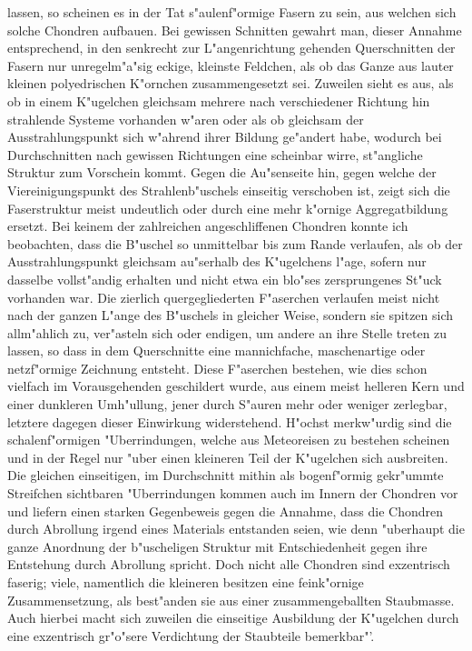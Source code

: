 \documentclass[a4paper, 11pt, oneside]{article}
\begin{document}
lassen, so scheinen es in der Tat s"aulenf"ormige Fasern zu sein, aus welchen sich solche Chondren aufbauen. Bei gewissen Schnitten gewahrt man, dieser Annahme entsprechend, in den senkrecht zur L"angenrichtung gehenden Querschnitten der Fasern nur unregelm"a"sig eckige, kleinste Feldchen, als ob das Ganze aus lauter kleinen polyedrischen K"ornchen zusammengesetzt sei. Zuweilen sieht es aus, als ob in einem K"ugelchen gleichsam mehrere nach verschiedener Richtung hin strahlende Systeme vorhanden w"aren oder als ob gleichsam der Ausstrahlungspunkt sich w"ahrend ihrer Bildung ge"andert habe, wodurch bei Durchschnitten nach gewissen Richtungen eine scheinbar wirre, st"angliche Struktur zum Vorschein kommt. Gegen die Au"senseite hin, gegen welche der Viereinigungspunkt des Strahlenb"uschels einseitig verschoben ist, zeigt sich die Faserstruktur meist undeutlich oder durch eine mehr k"ornige Aggregatbildung ersetzt. Bei keinem der zahlreichen angeschliffenen Chondren konnte ich beobachten, dass die B"uschel so unmittelbar bis zum Rande verlaufen, als ob der Ausstrahlungspunkt gleichsam au"serhalb des K"ugelchens l"age, sofern nur dasselbe vollst"andig erhalten und nicht etwa ein blo"ses zersprungenes St"uck vorhanden war. Die zierlich quergegliederten F"aserchen verlaufen meist nicht nach der ganzen L"ange des B"uschels in gleicher Weise, sondern sie spitzen sich allm"ahlich zu, ver"asteln sich oder endigen, um andere an ihre Stelle treten zu lassen, so dass in dem Querschnitte eine mannichfache, maschenartige oder netzf"ormige Zeichnung entsteht. Diese F"aserchen bestehen, wie dies schon vielfach im Vorausgehenden geschildert wurde, aus einem meist helleren Kern und einer dunkleren Umh"ullung, jener durch S"auren mehr oder weniger zerlegbar, letztere dagegen dieser Einwirkung widerstehend. H"ochst merkw"urdig sind die schalenf"ormigen "Uberrindungen, welche aus Meteoreisen zu bestehen scheinen und in der Regel nur "uber einen kleineren Teil der K"ugelchen sich ausbreiten. Die gleichen einseitigen, im Durchschnitt mithin als bogenf"ormig gekr"ummte Streifchen sichtbaren "Uberrindungen kommen auch im Innern der Chondren vor und liefern einen starken Gegenbeweis gegen die Annahme, dass die Chondren durch Abrollung irgend eines Materials entstanden seien, wie denn "uberhaupt die ganze Anordnung der b"uscheligen Struktur mit Entschiedenheit gegen ihre Entstehung durch Abrollung spricht. Doch nicht alle Chondren sind exzentrisch faserig; viele, namentlich die kleineren besitzen eine feink"ornige Zusammensetzung, als best"anden sie aus einer zusammengeballten Staubmasse. Auch hierbei macht sich zuweilen die einseitige Ausbildung der K"ugelchen durch eine exzentrisch gr"o"sere Verdichtung der Staubteile bemerkbar"'.
\end{document}
